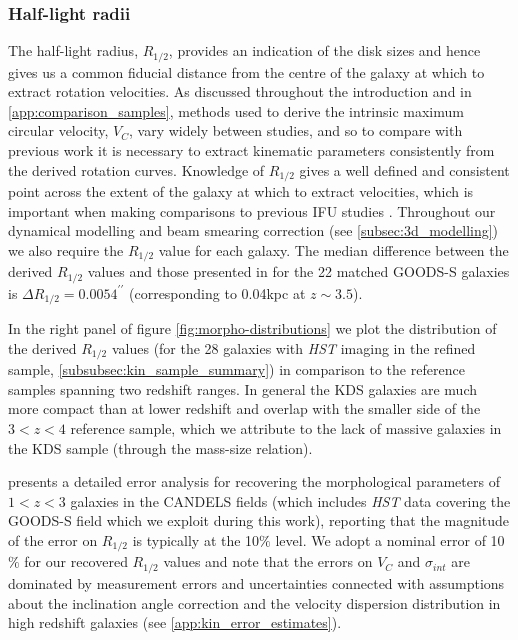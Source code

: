 \documentclass[fleqn,usenatbib]{mn2e}
\begin{document}
\subsubsection{Half-light radii}\label{subsubsection:half-light_radii}
The half-light radius, $R_{1/2}$, provides an indication of the disk sizes and hence gives us a common fiducial distance from the centre of the galaxy at which to extract rotation velocities.
As discussed throughout the introduction and in \cref{app:comparison_samples}, methods used to derive the intrinsic maximum circular velocity, $V_{C}$, vary widely between studies, and so to compare with previous work it is necessary to extract kinematic parameters consistently from the derived rotation curves.
Knowledge of $R_{1/2}$ gives a well defined and consistent point across the extent of the galaxy at which to extract velocities, which is important when making comparisons to previous IFU studies \citep[see \protect\cref{app:comparison_samples} and e.g.][]{ForsterSchreiber2009,Epinat2012,Wisnioski2015,Stott2016,Harrison2017,Swinbank2017}.
Throughout our dynamical modelling and beam smearing correction (see \cref{subsec:3d_modelling}) we also require the $R_{1/2}$ value for each galaxy.
The median difference between the derived $R_{1/2}$ values and those presented in \cite{VanderWel2012} for the 22 matched GOODS-S galaxies is $\Delta R_{1/2} = 0.0054^{\prime\prime}$ (corresponding to 0.04kpc at $z\sim3.5$).

In the right panel of figure \ref{fig:morpho-distributions} we plot the distribution of the derived $R_{1/2}$ values (for the 28 galaxies with {\em HST} imaging in the refined sample, \cref{subsubsec:kin_sample_summary}) in comparison to the reference samples spanning two redshift ranges.
In general the KDS galaxies are much more compact than at lower redshift and overlap with the smaller side of the $3 < z < 4$ reference sample, which we attribute to the lack of massive galaxies in the KDS sample (through the mass-size relation).

\cite{Bruce2012} presents a detailed error analysis for recovering the morphological parameters of $1 < z < 3$ galaxies in the CANDELS fields (which includes {\em HST} data covering the GOODS-S field which we exploit during this work), reporting that the magnitude of the error on $R_{1/2}$ is typically at the 10$\%$ level.
We adopt a nominal error of 10$\%$ for our recovered $R_{1/2}$ values and note that the errors on $V_{C}$ and $\sigma_{int}$ are dominated by measurement errors and uncertainties connected with assumptions about the inclination angle correction and the velocity dispersion distribution in high redshift galaxies (see \cref{app:kin_error_estimates}).
\end{document}
